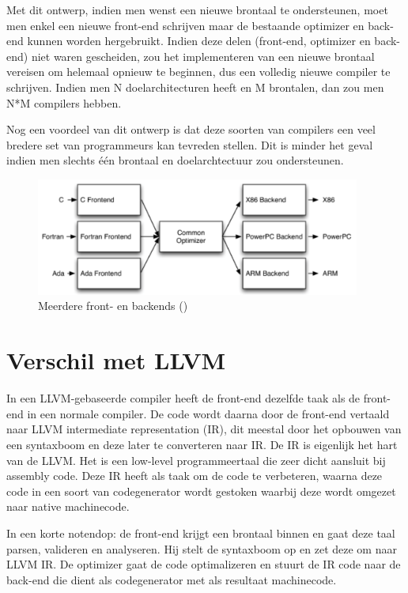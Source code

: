 Met dit ontwerp, indien men wenst een nieuwe brontaal te ondersteunen, moet men enkel een nieuwe front-end schrijven maar de bestaande optimizer en back-end kunnen worden hergebruikt. Indien deze delen (front-end, optimizer en back-end) niet waren gescheiden, zou het implementeren van een nieuwe brontaal vereisen om helemaal opnieuw te beginnen, dus een volledig nieuwe compiler te schrijven. Indien men N doelarchitecturen heeft en M brontalen, dan zou men N*M compilers hebben.

Nog een voordeel van dit ontwerp is dat deze soorten van compilers een veel bredere set van programmeurs kan tevreden stellen. Dit is minder het geval indien men slechts één brontaal en doelarchtectuur zou ondersteunen. 

\begin{figure} [ht]
	\centering
	\includegraphics[width=0.95\textwidth]{img/llvmdriefasen}
	\caption{Meerdere front- en backends (\cite{aosa})}
	\label{fig:llvmdriefasen}
\end{figure}

\section{Verschil met LLVM}
\label{sec:difference-llvm}
In een LLVM-gebaseerde compiler heeft de front-end dezelfde taak als de front-end in een normale compiler. De code wordt daarna door de front-end vertaald naar LLVM intermediate representation (IR), dit meestal door het opbouwen van een syntaxboom en deze later te converteren naar IR. De IR is eigenlijk het hart van de LLVM. Het is een low-level programmeertaal die zeer dicht aansluit bij assembly code. Deze IR heeft als taak om de code te verbeteren, waarna deze code in een soort van codegenerator wordt gestoken waarbij deze wordt omgezet naar native machinecode. 

In een korte notendop: de front-end krijgt een brontaal binnen en gaat deze taal parsen, valideren en analyseren. Hij stelt de syntaxboom op en zet deze om naar LLVM IR. De optimizer gaat de code optimalizeren en stuurt de IR code naar de back-end die dient als codegenerator met als resultaat machinecode.

